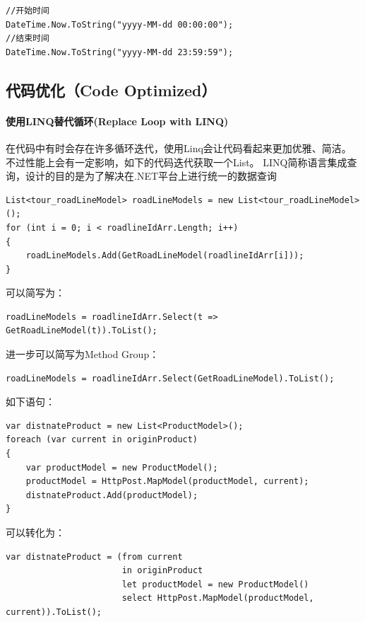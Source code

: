 \documentclass{book}
\begin{document}
\begin{lstlisting}[language={[Sharp]C}]
//开始时间
DateTime.Now.ToString("yyyy-MM-dd 00:00:00");
//结束时间
DateTime.Now.ToString("yyyy-MM-dd 23:59:59"); 
\end{lstlisting}

\subsection{代码优化（Code Optimized）}

\paragraph{使用LINQ替代循环(Replace Loop with LINQ)}

在代码中有时会存在许多循环迭代，使用Linq会让代码看起来更加优雅、简洁。
不过性能上会有一定影响，如下的代码迭代获取一个List。
LINQ简称语言集成查询，设计的目的是为了解决在.NET平台上进行统一的数据查询

\begin{lstlisting}[language={[Sharp]C}]
List<tour_roadLineModel> roadLineModels = new List<tour_roadLineModel>();
for (int i = 0; i < roadlineIdArr.Length; i++)
{
    roadLineModels.Add(GetRoadLineModel(roadlineIdArr[i]));
}
\end{lstlisting}

可以简写为：

\begin{lstlisting}[language={[Sharp]C}]
roadLineModels = roadlineIdArr.Select(t => GetRoadLineModel(t)).ToList();
\end{lstlisting}

进一步可以简写为Method Group：

\begin{lstlisting}[language={[Sharp]C}]
roadLineModels = roadlineIdArr.Select(GetRoadLineModel).ToList();
\end{lstlisting}

如下语句：

\begin{lstlisting}[language={[Sharp]C}]
var distnateProduct = new List<ProductModel>();
foreach (var current in originProduct)
{
    var productModel = new ProductModel();
    productModel = HttpPost.MapModel(productModel, current);
    distnateProduct.Add(productModel);
}
\end{lstlisting}

可以转化为：

\begin{lstlisting}[language={[Sharp]C}]
 var distnateProduct = (from current 
                       in originProduct 
                       let productModel = new ProductModel() 
                       select HttpPost.MapModel(productModel, current)).ToList();
                
\end{lstlisting}
\end{document}
